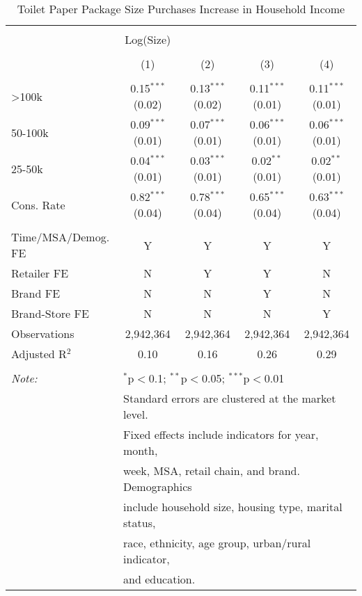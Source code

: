 
\begin{table}[!htbp] \centering 
  \caption{Toilet Paper Package Size Purchases Increase in Household Income} 
  \label{tab:packageSizeFullTP} 
\begin{tabular}{@{\extracolsep{5pt}}lcccc} 
\\[-1.8ex]\hline 
\hline \\[-1.8ex] 
 & Log(Size) &  &  &  \\ 
\\[-1.8ex] & (1) & (2) & (3) & (4)\\ 
\hline \\[-1.8ex] 
 >100k & 0.15$^{***}$ (0.02) & 0.13$^{***}$ (0.02) & 0.11$^{***}$ (0.01) & 0.11$^{***}$ (0.01) \\ 
  50-100k & 0.09$^{***}$ (0.01) & 0.07$^{***}$ (0.01) & 0.06$^{***}$ (0.01) & 0.06$^{***}$ (0.01) \\ 
  25-50k & 0.04$^{***}$ (0.01) & 0.03$^{***}$ (0.01) & 0.02$^{**}$ (0.01) & 0.02$^{**}$ (0.01) \\ 
  Cons. Rate & 0.82$^{***}$ (0.04) & 0.78$^{***}$ (0.04) & 0.65$^{***}$ (0.04) & 0.63$^{***}$ (0.04) \\ 
 \hline \\[-1.8ex] 
Time/MSA/Demog. FE & Y & Y & Y & Y \\ 
Retailer FE & N & Y & Y & N \\ 
Brand FE & N & N & Y & N \\ 
Brand-Store FE & N & N & N & Y \\ 
Observations & 2,942,364 & 2,942,364 & 2,942,364 & 2,942,364 \\ 
Adjusted R$^{2}$ & 0.10 & 0.16 & 0.26 & 0.29 \\ 
\hline 
\hline \\[-1.8ex] 
\textit{Note:}  & \multicolumn{4}{l}{$^{*}$p$<$0.1; $^{**}$p$<$0.05; $^{***}$p$<$0.01} \\ 
 & \multicolumn{4}{l}{Standard errors are clustered at the market level.} \\ 
 & \multicolumn{4}{l}{Fixed effects include indicators for year, month, } \\ 
 & \multicolumn{4}{l}{week, MSA, retail chain, and brand. Demographics } \\ 
 & \multicolumn{4}{l}{include household size, housing type, marital status, } \\ 
 & \multicolumn{4}{l}{race, ethnicity, age group, urban/rural indicator, } \\ 
 & \multicolumn{4}{l}{and education.} \\ 
\end{tabular} 
\end{table} 
